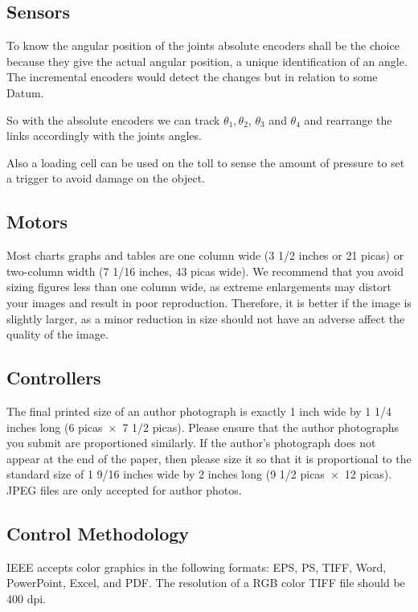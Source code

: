 \documentclass[transmag]{IEEEtran}
\begin{document}
\subsection{Sensors}

To know the angular position of the joints absolute encoders shall be the choice because they give the actual angular position, a unique identification of an angle. The incremental encoders would detect the changes but in relation to some Datum. \cite{ref3}

So with the absolute encoders we can track $\theta_1,\theta_2$, $\theta_3$ and $\theta_4$ and rearrange the links accordingly with the joints angles.

Also a loading cell can be used on the toll to sense the amount of pressure to set a trigger to avoid damage on the object.

\subsection{Motors}

Most charts graphs and tables are one column wide (3 1/2 inches or 21 picas) 
or two-column width (7 1/16 inches, 43 picas wide). We recommend that you 
avoid sizing figures less than one column wide, as extreme enlargements may 
distort your images and result in poor reproduction. Therefore, it is better 
if the image is slightly larger, as a minor reduction in size should not 
have an adverse affect the quality of the image. 

\subsection{Controllers}

The final printed size of an author photograph is exactly 
1 inch wide by 1 1/4 inches long (6 picas~$\times$~7 1/2 picas). Please 
ensure that the author photographs you submit are proportioned similarly. If 
the author's photograph does not appear at the end of the paper, then please 
size it so that it is proportional to the standard size of 1 9/16 inches 
wide by 
2 inches long (9 1/2 picas~$\times$~12 picas). JPEG files are only 
accepted for author photos.

\subsection{Control Methodology}

IEEE accepts color graphics in the following formats: EPS, PS, TIFF, Word, 
PowerPoint, Excel, and PDF. The resolution of a RGB color TIFF file should 
be 400 dpi. 
\end{document}
